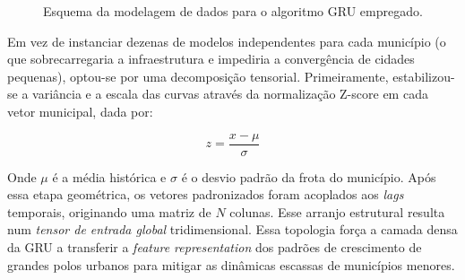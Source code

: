 \documentclass[10pt,conference]{IEEEtran}
\begin{document}
\begin{figure}[!ht]
\centering
{}
\caption{Esquema da modelagem de dados para o algoritmo GRU empregado.}
\label{fig:gru_fluxo}
\end{figure}

Em vez de instanciar dezenas de modelos independentes para cada município (o que sobrecarregaria a infraestrutura e impediria a convergência de cidades pequenas), optou-se por uma decomposição tensorial. Primeiramente, estabilizou-se a variância e a escala das curvas através da normalização Z-score em cada vetor municipal, dada por:

$$z = \frac{x - \mu}{\sigma}$$

Onde $\mu$ é a média histórica e $\sigma$ é o desvio padrão da frota do município. Após essa etapa geométrica, os vetores padronizados foram acoplados aos \textit{lags} temporais, originando uma matriz de $N$ colunas. Esse arranjo estrutural resulta num \textit{tensor de entrada global} tridimensional. Essa topologia força a camada densa da GRU a transferir a \textit{feature representation} dos padrões de crescimento de grandes polos urbanos para mitigar as dinâmicas escassas de municípios menores.
\end{document}

